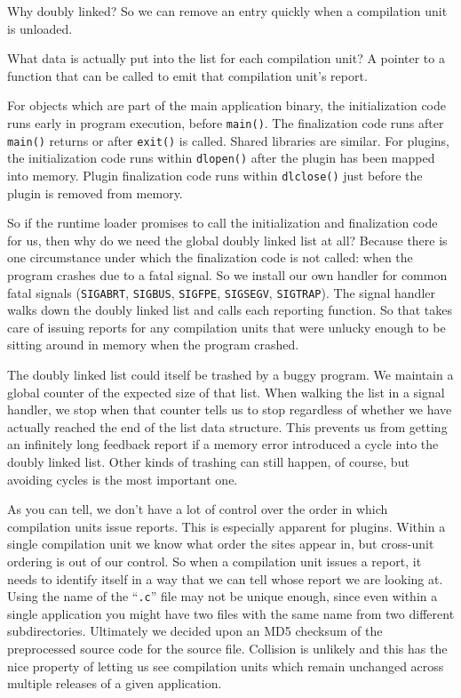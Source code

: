 \documentclass[times,10pt,twocolumn]{article}
\begin{document}
Why doubly linked?  So we can remove an entry quickly when a
compilation unit is unloaded.

What data is actually put into the list for each compilation unit?  A
pointer to a function that can be called to emit that compilation
unit's report.

For objects which are part of the main application binary, the
initialization code runs early in program execution, before
\texttt{main()}.  The finalization code runs after \texttt{main()}
returns or after \texttt{exit()} is called.  Shared libraries are
similar.  For plugins, the initialization code runs within
\texttt{dlopen()} after the plugin has been mapped into memory.
Plugin finalization code runs within \texttt{dlclose()} just before
the plugin is removed from memory.

So if the runtime loader promises to call the initialization and
finalization code for us, then why do we need the global doubly linked
list at all?  Because there is one circumstance under which the
finalization code is not called: when the program crashes due to a
fatal signal.  So we install our own handler for common fatal signals
(\texttt{SIGABRT}, \texttt{SIGBUS}, \texttt{SIGFPE}, \texttt{SIGSEGV},
\texttt{SIGTRAP}).  The signal handler walks down the doubly linked
list and calls each reporting function.  So that takes care of issuing
reports for any compilation units that were unlucky enough to be
sitting around in memory when the program crashed.

The doubly linked list could itself be trashed by a buggy program.  We
maintain a global counter of the expected size of that list.  When
walking the list in a signal handler, we stop when that counter tells
us to stop regardless of whether we have actually reached the end of
the list data structure.  This prevents us from getting an infinitely
long feedback report if a memory error introduced a cycle into the
doubly linked list.  Other kinds of trashing can still happen, of
course, but avoiding cycles is the most important one.

As you can tell, we don't have a lot of control over the order in
which compilation units issue reports.  This is especially apparent
for plugins.  Within a single compilation unit we know what order the
sites appear in, but cross-unit ordering is out of our control.  So
when a compilation unit issues a report, it needs to identify itself
in a way that we can tell whose report we are looking at.  Using the
name of the ``\texttt{.c}'' file may not be unique enough, since even
within a single application you might have two files with the same
name from two different subdirectories.  Ultimately we decided upon an
MD5 checksum of the preprocessed source code for the source file.
Collision is unlikely and this has the nice property of letting us see
compilation units which remain unchanged across multiple releases of a
given application.
\end{document}
